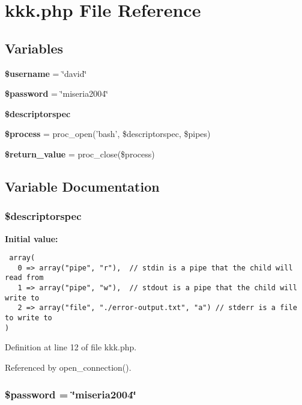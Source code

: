 \section{kkk.php File Reference}
\label{kkk_8php}
\subsection*{Variables}
\begin{CompactItemize}
\item 
{\bf \$username} = \char`\"{}david\char`\"{}
\item 
{\bf \$password} = \char`\"{}miseria2004\char`\"{}
\item 
{\bf \$descriptorspec}
\item 
{\bf \$process} = proc\_\-open('bash', \$descriptorspec, \$pipes)
\item 
{\bf \$return\_\-value} = proc\_\-close(\$process)
\end{CompactItemize}


\subsection{Variable Documentation}
\subsubsection{\setlength{\rightskip}{0pt plus 5cm}\$descriptorspec}\label{kkk_8php_a2}


{\bf Initial value:}

\footnotesize\begin{verbatim} array(
   0 => array("pipe", "r"),  // stdin is a pipe that the child will read from
   1 => array("pipe", "w"),  // stdout is a pipe that the child will write to
   2 => array("file", "./error-output.txt", "a") // stderr is a file to write to
)
\end{verbatim}\normalsize 


Definition at line 12 of file kkk.php.

Referenced by open\_\-connection().
\subsubsection{\setlength{\rightskip}{0pt plus 5cm}\$password = \char`\"{}miseria2004\char`\"{}}\label{kkk_8php_a1}




